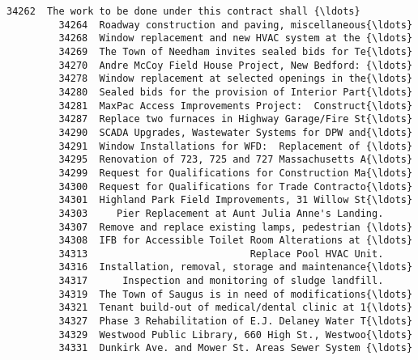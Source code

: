 \documentclass[11pt]{article}
\begin{document}
\begin{Verbatim}[commandchars=\\\{\}]
         34262  The work to be done under this contract shall {\ldots}   
         34264  Roadway construction and paving, miscellaneous{\ldots}   
         34268  Window replacement and new HVAC system at the {\ldots}   
         34269  The Town of Needham invites sealed bids for Te{\ldots}   
         34270  Andre McCoy Field House Project, New Bedford: {\ldots}   
         34278  Window replacement at selected openings in the{\ldots}   
         34280  Sealed bids for the provision of Interior Part{\ldots}   
         34281  MaxPac Access Improvements Project:  Construct{\ldots}   
         34287  Replace two furnaces in Highway Garage/Fire St{\ldots}   
         34290  SCADA Upgrades, Wastewater Systems for DPW and{\ldots}   
         34291  Window Installations for WFD:  Replacement of {\ldots}   
         34295  Renovation of 723, 725 and 727 Massachusetts A{\ldots}   
         34299  Request for Qualifications for Construction Ma{\ldots}   
         34300  Request for Qualifications for Trade Contracto{\ldots}   
         34301  Highland Park Field Improvements, 31 Willow St{\ldots}   
         34303     Pier Replacement at Aunt Julia Anne's Landing.   
         34307  Remove and replace existing lamps, pedestrian {\ldots}   
         34308  IFB for Accessible Toilet Room Alterations at {\ldots}   
         34313                            Replace Pool HVAC Unit.   
         34316  Installation, removal, storage and maintenance{\ldots}   
         34317      Inspection and monitoring of sludge landfill.   
         34319  The Town of Saugus is in need of modifications{\ldots}   
         34321  Tenant build-out of medical/dental clinic at 1{\ldots}   
         34327  Phase 3 Rehabilitation of E.J. Delaney Water T{\ldots}   
         34329  Westwood Public Library, 660 High St., Westwoo{\ldots}   
         34331  Dunkirk Ave. and Mower St. Areas Sewer System {\ldots}   
         

\end{Verbatim}
\end{document}
